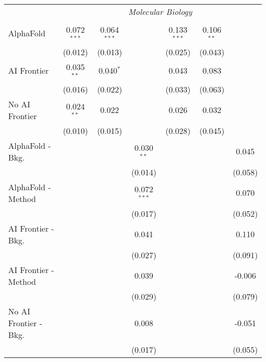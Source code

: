 \begin{tabular}{lcccccc}
 & \multicolumn{6}{c}{\textit{Molecular Biology}} \\ \\
   AlphaFold               & 0.072$^{***}$ & 0.064$^{***}$ &               & 0.133$^{***}$ & 0.106$^{**}$ &   \\   
                           & (0.012)       & (0.013)       &               & (0.025)       & (0.043)      &   \\   
   AI Frontier             & 0.035$^{**}$  & 0.040$^{*}$   &               & 0.043         & 0.083        &   \\   
                           & (0.016)       & (0.022)       &               & (0.033)       & (0.063)      &   \\   
   No AI Frontier          & 0.024$^{**}$  & 0.022         &               & 0.026         & 0.032        &   \\   
                           & (0.010)       & (0.015)       &               & (0.028)       & (0.045)      &   \\   
   AlphaFold - Bkg.        &               &               & 0.030$^{**}$  &               &              & 0.045\\   
                           &               &               & (0.014)       &               &              & (0.058)\\   
   AlphaFold - Method      &               &               & 0.072$^{***}$ &               &              & 0.070\\   
                           &               &               & (0.017)       &               &              & (0.052)\\   
   AI Frontier - Bkg.      &               &               & 0.041         &               &              & 0.110\\   
                           &               &               & (0.027)       &               &              & (0.091)\\   
   AI Frontier - Method    &               &               & 0.039         &               &              & -0.006\\   
                           &               &               & (0.029)       &               &              & (0.079)\\   
   No AI Frontier - Bkg.   &               &               & 0.008         &               &              & -0.051\\   
                           &               &               & (0.017)       &               &              & (0.055)\\   

\end{tabular}
